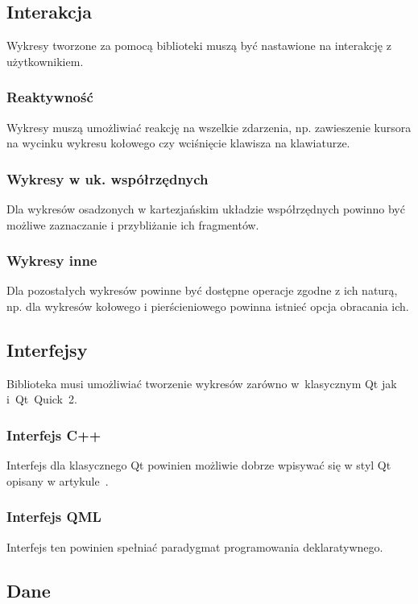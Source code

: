\documentclass[11pt,twoside,a4paper,final]{article}
\begin{document}
\subsection{Interakcja}
Wykresy tworzone za pomocą biblioteki muszą być nastawione na interakcję z użytkownikiem.

\subsubsection{Reaktywność}
Wykresy muszą umożliwiać reakcję na wszelkie zdarzenia, np. zawieszenie kursora na wycinku wykresu kołowego czy wciśnięcie klawisza na klawiaturze.

\subsubsection{Wykresy w uk. współrzędnych} 
Dla wykresów osadzonych w kartezjańskim układzie współrzędnych powinno być możliwe zaznaczanie i przybliżanie ich fragmentów. 

\subsubsection{Wykresy inne} 
Dla pozostałych wykresów powinne być dostępne operacje zgodne z ich naturą, np. dla wykresów kołowego i pierścieniowego powinna istnieć opcja obracania ich. 


\subsection{Interfejsy}
Biblioteka musi umożliwiać tworzenie wykresów zarówno w~klasycznym Qt jak i~Qt~Quick~2. 

\subsubsection{Interfejs C++}
Interfejs dla klasycznego Qt powinien możliwie dobrze wpisywać się w styl Qt opisany w artykule~\cite{qt-style-API}.

\subsubsection{Interfejs QML}
Interfejs ten powinien spełniać paradygmat programowania deklaratywnego.

\subsection{Dane}
\end{document}
